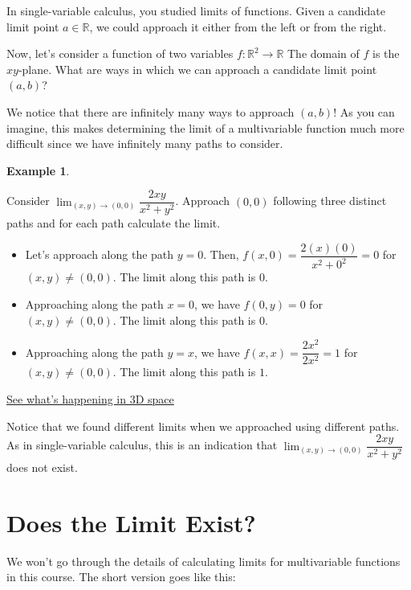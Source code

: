 \documentclass[
]{book}
\providecommand{\tightlist}{%
  \setlength{\itemsep}{0pt}\setlength{\parskip}{0pt}}
\theoremstyle{definition}
\theoremstyle{definition}
\newtheorem{example}{Example}[chapter]
\theoremstyle{definition}
\theoremstyle{definition}
\theoremstyle{remark}
\begin{document}
In single-variable calculus, you studied limits of functions. Given a candidate limit point \(a\in\mathbb{R}\), we could approach it either from the left or from the right.

Now, let's consider a function of two variables \(f:\mathbb{R}^2\to\mathbb{R}\) The domain of \(f\) is the \(xy\)-plane. What are ways in which we can approach a candidate limit point \((a,b)\)?

We notice that there are infinitely many ways to approach \((a,b)\)! As you can imagine, this makes determining the limit of a multivariable function much more difficult since we have infinitely many paths to consider.

\begin{example}
\protect\hypertarget{exm:unlabeled-div-9}{}\label{exm:unlabeled-div-9}

Consider \(\displaystyle \lim_{(x,y)\to(0,0)} \dfrac{2xy}{x^2+y^2}\). Approach \((0,0)\) following three distinct paths and for each path calculate the limit.

\begin{itemize}
\tightlist
\item
  Let's approach along the path \(y=0\). Then, \(f(x,0)=\dfrac{2(x)(0)}{x^2+0^2}=0\) for \((x,y)\neq (0,0)\). The limit along this path is \(0\).
\item
  Approaching along the path \(x=0\), we have \(f(0,y)=0\) for \((x,y)\neq (0,0)\). The limit along this path is \(0\).
\item
  Approaching along the path \(y=x\), we have \(f(x,x)=\dfrac{2x^2}{2x^2}=1\) for \((x,y)\neq (0,0)\). The limit along this path is \(1\).
\end{itemize}

\end{example}

\href{https://www.geogebra.org/m/vvywtdnx}{See what's happening in 3D space}

Notice that we found different limits when we approached using different paths. As in single-variable calculus, this is an indication that \(\displaystyle \lim_{(x,y)\to(0,0)} \dfrac{2xy}{x^2+y^2}\) does not exist.

\hypertarget{does-the-limit-exist}{%
\section{Does the Limit Exist?}\label{does-the-limit-exist}}

We won't go through the details of calculating limits for multivariable functions in this course. The short version goes like this:
\end{document}
